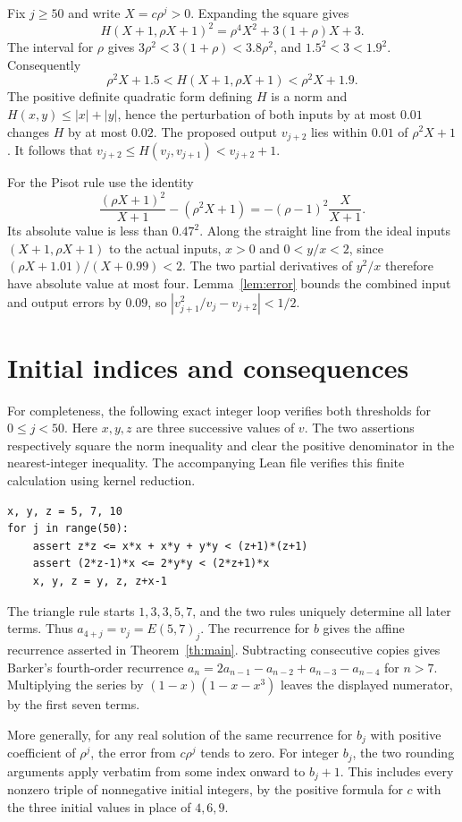 \documentclass[11pt,letterpaper]{article}
\begin{document}
Fix \(j\ge50\) and write \(X=c\rho^j>0\). Expanding the square gives
\[
 H(X+1,\rho X+1)^2=\rho^4X^2+3(1+\rho)X+3.
\]
The interval for \(\rho\) gives \(3\rho^2<3(1+\rho)<3.8\rho^2\), and \(1.5^2<3<1.9^2\). Consequently
\[
 \rho^2 X+1.5<H(X+1,\rho X+1)<\rho^2 X+1.9 .
\]
The positive definite quadratic form defining \(H\) is a norm and \(H(x,y)\le |x|+|y|\), hence the perturbation of both inputs by at most \(0.01\) changes \(H\) by at most \(0.02\). The proposed output \(v_{j+2}\) lies within \(0.01\) of \(\rho^2X+1\). It follows that \(v_{j+2}\le H(v_j,v_{j+1})<v_{j+2}+1\).

For the Pisot rule use the identity
\[
 \frac{(\rho X+1)^2}{X+1}-(\rho^2 X+1)
 =-(\rho-1)^2\frac{X}{X+1}.
\]
Its absolute value is less than \(0.47^2\). Along the straight line from the ideal inputs \((X+1,\rho X+1)\) to the actual inputs, \(x>0\) and \(0<y/x<2\), since \((\rho X+1.01)/(X+0.99)<2\). The two partial derivatives of \(y^2/x\) therefore have absolute value at most four. Lemma~\ref{lem:error} bounds the combined input and output errors by \(0.09\), so \(|v_{j+1}^2/v_j-v_{j+2}|<1/2\).

\section{Initial indices and consequences}
For completeness, the following exact integer loop verifies both thresholds for \(0\le j<50\). Here \(x,y,z\) are three successive values of \(v\). The two assertions respectively square the norm inequality and clear the positive denominator in the nearest-integer inequality. The accompanying Lean file verifies this finite calculation using kernel reduction.
\begin{verbatim}
x, y, z = 5, 7, 10
for j in range(50):
    assert z*z <= x*x + x*y + y*y < (z+1)*(z+1)
    assert (2*z-1)*x <= 2*y*y < (2*z+1)*x
    x, y, z = y, z, z+x-1
\end{verbatim}
The triangle rule starts \(1,3,3,5,7\), and the two rules uniquely determine all later terms. Thus \(a_{4+j}=v_j=E(5,7)_j\). The recurrence for \(b\) gives the affine recurrence asserted in Theorem~\ref{th:main}. Subtracting consecutive copies gives Barker's fourth-order recurrence \(a_n=2a_{n-1}-a_{n-2}+a_{n-3}-a_{n-4}\) for \(n>7\). Multiplying the series by \((1-x)(1-x-x^3)\) leaves the displayed numerator, by the first seven terms.

More generally, for any real solution of the same recurrence for \(b_j\) with positive coefficient of \(\rho^j\), the error from \(c\rho^j\) tends to zero. For integer \(b_j\), the two rounding arguments apply verbatim from some index onward to \(b_j+1\). This includes every nonzero triple of nonnegative initial integers, by the positive formula for \(c\) with the three initial values in place of \(4,6,9\).
\end{document}
